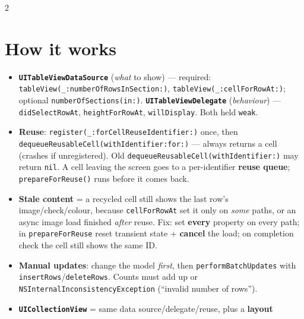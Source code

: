 \documentclass[8pt]{extarticle}
\begin{document}


\begin{multicols}{2}
\raggedright

\section{How it works}
\begin{itemize}
  \item \textbf{\texttt{UITableViewDataSource}} (\emph{what} to show) — required:
        \texttt{tableView(\_:numberOfRowsInSection:)}, \texttt{tableView(\_:cellForRowAt:)};
        optional \texttt{numberOfSections(in:)}. \textbf{\texttt{UITableViewDelegate}}
        (\emph{behaviour}) — \texttt{didSelectRowAt}, \texttt{heightForRowAt}, \texttt{willDisplay}.
        Both held \texttt{weak}.
  \item \textbf{Reuse}: \texttt{register(\_:forCellReuseIdentifier:)} once, then
        \texttt{dequeueReusableCell(withIdentifier:for:)} — always returns a cell (crashes if
        unregistered). Old \texttt{dequeueReusableCell(withIdentifier:)} may return \texttt{nil}.
        A cell leaving the screen goes to a per-identifier \textbf{reuse queue}; \sloppy
        \texttt{prepareForReuse()} runs before it comes back.
  \item \textbf{Stale content} = a recycled cell still shows the last row's image/check/colour,
        because \texttt{cellForRowAt} set it only on \emph{some} paths, or an async image load
        finished \emph{after} reuse. Fix: set \textbf{every} property on every path; in
        \texttt{prepareForReuse} reset transient state + \textbf{cancel} the load; on completion
        check the cell still shows the same ID.
  \item \textbf{Manual updates}: change the model \emph{first}, then \texttt{performBatchUpdates}
        with \texttt{insertRows}/\texttt{deleteRows}. Counts must add up or
        \texttt{NSInternalInconsistencyException} (``invalid number of rows'').
  \item \textbf{\texttt{UICollectionView}} = same data source/delegate/reuse, plus a \textbf{layout}

\end{itemize}
\end{multicols}
\end{document}
